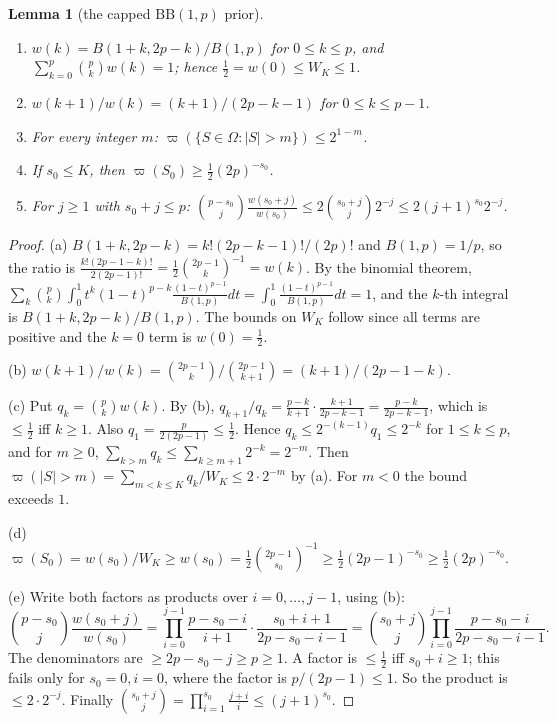 \documentclass[11pt]{article}
\newtheorem{lemma}[theorem]{Lemma}
\theoremstyle{remark}
\newcommand{\vp}{\varpi}
\newcommand{\Om}{\Omega}
\begin{document}
\begin{lemma}[the capped $\mathrm{BB}(1,p)$ prior]\label{lem:prior}
\begin{enumerate}
\item[(a)] $w(k)=B(1+k,2p-k)/B(1,p)$ for $0\le k\le p$, and $\sum_{k=0}^p\binom pkw(k)=1$; hence $\frac12=w(0)\le W_K\le1$.
\item[(b)] $w(k+1)/w(k)=(k+1)/(2p-k-1)$ for $0\le k\le p-1$.
\item[(c)] For every integer $m$: $\vp(\{S\in\Om:|S|>m\})\le 2^{1-m}$.
\item[(d)] If $s_0\le K$, then $\vp(S_0)\ge\frac12(2p)^{-s_0}$.
\item[(e)] For $j\ge1$ with $s_0+j\le p$: $\binom{p-s_0}{j}\frac{w(s_0+j)}{w(s_0)}\le2\binom{s_0+j}{j}2^{-j}\le2(j+1)^{s_0}2^{-j}$.
\end{enumerate}
\end{lemma}
\begin{proof}
(a) $B(1+k,2p-k)=k!(2p-k-1)!/(2p)!$ and $B(1,p)=1/p$, so the ratio is $\frac{k!(2p-1-k)!}{2(2p-1)!}=\frac12\binom{2p-1}{k}^{-1}=w(k)$. By the binomial theorem,
$\sum_k\binom pk\int_0^1t^k(1-t)^{p-k}\frac{(1-t)^{p-1}}{B(1,p)}dt=\int_0^1\frac{(1-t)^{p-1}}{B(1,p)}dt=1$, and the $k$-th integral is $B(1+k,2p-k)/B(1,p)$. The bounds on $W_K$ follow since all terms are positive and the $k=0$ term is $w(0)=\frac12$.

(b) $w(k+1)/w(k)=\binom{2p-1}{k}\big/\binom{2p-1}{k+1}=(k+1)/(2p-1-k)$.

(c) Put $q_k=\binom pkw(k)$. By (b), $q_{k+1}/q_k=\frac{p-k}{k+1}\cdot\frac{k+1}{2p-k-1}=\frac{p-k}{2p-k-1}$, which is $\le\frac12$ iff $k\ge1$. Also $q_1=\frac{p}{2(2p-1)}\le\frac12$. Hence $q_k\le2^{-(k-1)}q_1\le2^{-k}$ for $1\le k\le p$, and for $m\ge0$, $\sum_{k>m}q_k\le\sum_{k\ge m+1}2^{-k}=2^{-m}$. Then $\vp(|S|>m)=\sum_{m<k\le K}q_k/W_K\le2\cdot2^{-m}$ by (a). For $m<0$ the bound exceeds $1$.

(d) $\vp(S_0)=w(s_0)/W_K\ge w(s_0)=\frac12\binom{2p-1}{s_0}^{-1}\ge\frac12(2p-1)^{-s_0}\ge\frac12(2p)^{-s_0}$.

(e) Write both factors as products over $i=0,\dots,j-1$, using (b):
\[
\binom{p-s_0}{j}\frac{w(s_0+j)}{w(s_0)}=\prod_{i=0}^{j-1}\frac{p-s_0-i}{i+1}\cdot\frac{s_0+i+1}{2p-s_0-i-1}=\binom{s_0+j}{j}\prod_{i=0}^{j-1}\frac{p-s_0-i}{2p-s_0-i-1}.
\]
The denominators are $\ge 2p-s_0-j\ge p\ge1$. A factor is $\le\frac12$ iff $s_0+i\ge1$; this fails only for $s_0=0,i=0$, where the factor is $p/(2p-1)\le1$. So the product is $\le2\cdot2^{-j}$. Finally $\binom{s_0+j}{j}=\prod_{i=1}^{s_0}\frac{j+i}{i}\le(j+1)^{s_0}$.
\end{proof}
\end{document}
